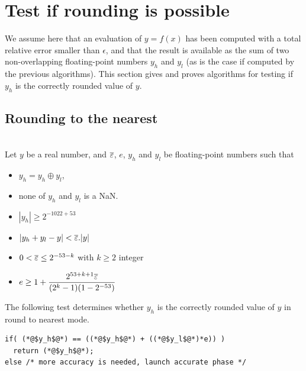 \section{Test if rounding is possible\label{section:testrounding}}

We assume here that an evaluation of $y=f(x)$ has been computed with a
total relative error smaller than $\epsilon$, and that the result is
available as the sum of two non-overlapping floating-point numbers
$y_h$ and $y_l$ (as is the case if computed by the previous
algorithms). This section gives and proves algorithms for testing if
$y_h$ is the correctly rounded value of $y$.




\subsection{Rounding to the nearest}

\begin{theorem}
\label{th:roundingRN1}
~\\
Let $y$ be a real number, and  ${\overline{\varepsilon}}$, $e$, $y_h$ and $y_l$ be
  floating-point numbers such that 
  \begin{itemize}
  \item $y_h=y_h\oplus y_l$,
  \item none of $y_h$ and $y_l$ is a  NaN.
  \item $|y_h|\ge 2^{-1022+53}$ 
  \item $|y_h+y_l - y| <{\overline{\varepsilon}}.|y|$
  \item $0<{\overline{\varepsilon}} \le 2^{-53-k}$ with $k\ge 2$ integer
  \item $e\ge 1+  \dfrac{2^{53+k+1}{\overline{\varepsilon}}}{(2^{k}-1)(1-2^{-53})}$
\end{itemize}

The following test determines whether $y_h$ is the
  correctly rounded value of $y$ in  round to nearest mode.

\begin{lstlisting}[caption={Test for rounding to the nearest},
  firstnumber=1]
if( (*@$y_h$@*) == ((*@$y_h$@*) + ((*@$y_l$@*)*e)) )
  return (*@$y_h$@*);
else /* more accuracy is needed, launch accurate phase */
\end{lstlisting}
\end{theorem}

